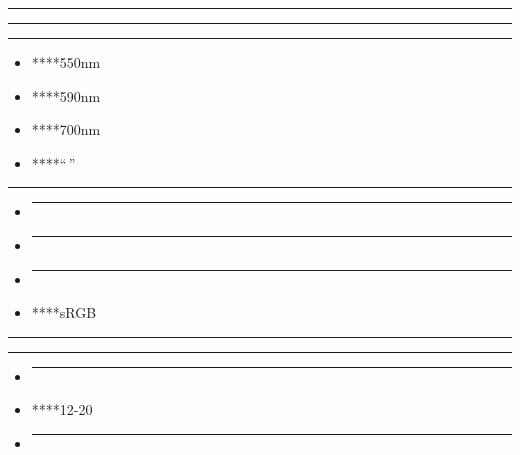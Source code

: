 \begin{center}\rule{0.5\linewidth}{0.5pt}\end{center}

\begin{center}\rule{0.5\linewidth}{0.5pt}\end{center}

\begin{center}\rule{0.5\linewidth}{0.5pt}\end{center}

\begin{itemize}
\tightlist
\item
  ****550nm
\item
  ****590nm
\item
  ****700nm
\item
  ****``\,''
\end{itemize}

\begin{center}\rule{0.5\linewidth}{0.5pt}\end{center}

\begin{itemize}
\item
  \begin{center}\rule{0.5\linewidth}{0.5pt}\end{center}
\item
  \begin{center}\rule{0.5\linewidth}{0.5pt}\end{center}
\item
  \begin{center}\rule{0.5\linewidth}{0.5pt}\end{center}
\item
  ****sRGB
\end{itemize}

\begin{center}\rule{0.5\linewidth}{0.5pt}\end{center}

\begin{center}\rule{0.5\linewidth}{0.5pt}\end{center}

\begin{itemize}
\item
  \begin{center}\rule{0.5\linewidth}{0.5pt}\end{center}
\item
  ****12-20
\item
  \begin{center}\rule{0.5\linewidth}{0.5pt}\end{center}
\end{itemize}

